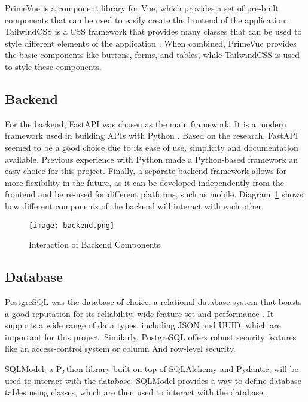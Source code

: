 PrimeVue is a component library for Vue, which provides a set of pre-built components that can be used to easily create the frontend of the application \parencite{primevue}. TailwindCSS is a CSS framework that provides many classes that can be used to style different elements of the application \parencite{tailwind}. When combined, PrimeVue provides the basic components like buttons, forms, and tables, while TailwindCSS is used to style these components.

\subsection{Backend}

For the backend, FastAPI was chosen as the main framework. It is a modern framework used in building APIs with Python \parencite{fastapi}. Based on the research, FastAPI seemed to be a good choice due to its ease of use, simplicity and documentation available. Previous experience with Python made a Python-based framework an easy choice for this project. Finally, a separate backend framework allows for more flexibility in the future, as it can be developed independently from the frontend and be re-used for different platforms, such as mobile. Diagram~\ref{fig:backend} shows how different components of the backend will interact with each other.

\begin{figure}[htbp]
    \centering
    \texttt{[image: backend.png]}
    \caption{Interaction of Backend Components}\label{fig:backend}
\end{figure}

\FloatBarrier{}

\subsection{Database}

PostgreSQL was the database of choice, a relational database system that boasts a good reputation for its reliability, wide feature set and performance \parencite{postgres}. It supports a wide range of data types, including JSON and UUID, which are important for this project. Similarly, PostgreSQL offers robust security features like an access-control system or column And row-level security. 

SQLModel, a Python library built on top of SQLAlchemy and Pydantic, will be used to interact with the database. SQLModel provides a way to define database tables using classes, which are then used to interact with the database \parencite{sqlmodel}.

